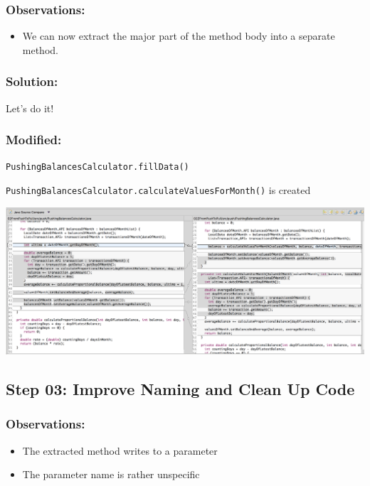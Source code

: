 \documentclass[a4paper,fleqn,titlepage,11pt]{article}
\begin{document}
\subsubsection*{Observations:}
\begin{itemize}
\item We can now extract the major part of the method body into a separate method.
\end{itemize}

\subsubsection*{Solution:}

Let's do it!

\subsubsection*{Modified:}

\texttt{PushingBalancesCalculator.fillData()}

\texttt{PushingBalancesCalculator.calculateValuesForMonth()} is created

\includegraphics[width=1\textwidth]{CompareViews/02-02Z.png}



\subsection*{Step 03: Improve Naming and Clean Up Code}

\subsubsection*{Observations:}
\begin{itemize}
\item The extracted method writes to a parameter
\item The parameter name is rather unspecific
\end{itemize}
\end{document}
